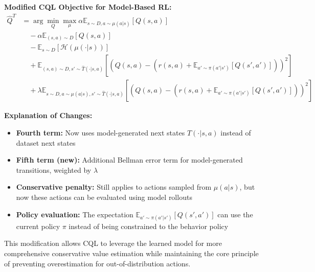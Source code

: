 \documentclass[12pt]{article}
\begin{document}
{{\begin{enumerate}
    \textbf{Modified CQL Objective for Model-Based RL:}
    \begin{align}
    \hat{Q}^T &= \arg \min_{Q} \max_{\mu} \alpha \mathbb{E}_{s \sim D, a \sim \mu(a|s)} [Q(s,a)] \\
    &\quad - \alpha \mathbb{E}_{(s,a) \sim D} [Q(s,a)] \\
    &\quad - \mathbb{E}_{s \sim D} [\mathcal{H}(\mu(\cdot|s))] \\
    &\quad + \mathbb{E}_{(s,a) \sim D, s' \sim \hat{T}(\cdot|s,a)} \left[ (Q(s,a) - (r(s,a) + \mathbb{E}_{a' \sim \pi(a'|s')}[Q(s',a')]))^2 \right] \\
    &\quad + \lambda \mathbb{E}_{s \sim D, a \sim \mu(a|s), s' \sim \hat{T}(\cdot|s,a)} \left[ (Q(s,a) - (r(s,a) + \mathbb{E}_{a' \sim \pi(a'|s')}[Q(s',a')]))^2 \right]
    \end{align}
    
    \textbf{Explanation of Changes:}
    \begin{itemize}
        \item \textbf{Fourth term:} Now uses model-generated next states $\hat{T}(\cdot|s,a)$ instead of dataset next states
        \item \textbf{Fifth term (new):} Additional Bellman error term for model-generated transitions, weighted by $\lambda$
        \item \textbf{Conservative penalty:} Still applies to actions sampled from $\mu(a|s)$, but now these actions can be evaluated using model rollouts
        \item \textbf{Policy evaluation:} The expectation $\mathbb{E}_{a' \sim \pi(a'|s')}[Q(s',a')]$ can use the current policy $\pi$ instead of being constrained to the behavior policy
    \end{itemize}
    
    This modification allows CQL to leverage the learned model for more comprehensive conservative value estimation while maintaining the core principle of preventing overestimation for out-of-distribution actions.
\end{enumerate}


}}


\newpage
\end{document}

